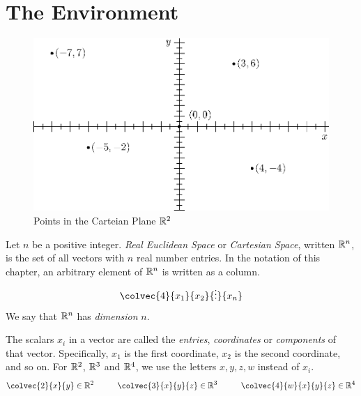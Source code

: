 \documentclass[fleqn,letterpaper]{report}
\begin{document}
\section{The Environment}
\label{vector-environment}

\begin{figure}[t]
\centering
\includegraphics[scale=1]{figure01.eps}
\caption{Points in the Carteian Plane $\mathbb{R}^2$}
\label{figure-cartesian-plane}
\end{figure}

\begin{defn}
Let $n$ be a positive integer. \emph{Real Euclidean Space} or
\emph{Cartesian Space}, written $\mathbb{R}^n$, is the set of all
vectors with $n$ real number entries. In the notation of this
chapter, an arbitrary element of $\mathbb{R}^n$ is written as a column. 
\begin{displaymath}
\colvec{4}{x_1}{x_2}{\vdots}{x_n}
\end{displaymath}
We say that $\mathbb{R}^n$ has \emph{dimension} $n$. 
\end{defn}

\begin{defn}
The scalars $x_i$ in a vector are
called the \emph{entries}, \emph{coordinates} or \emph{components} of that
vector. Specifically, $x_1$ is the first coordinate, $x_2$ is
the second coordinate, and so on. 
For $\mathbb{R}^2$, $\mathbb{R}^3$ and $\mathbb{R}^4$, we use the letters $x,y,z,w$
instead of $x_i$.
\begin{displaymath}
\colvec{2}{x}{y} \in \RR^2 \hspace{1cm}
\colvec{3}{x}{y}{z} \in \RR^3 \hspace{1cm}
\colvec{4}{w}{x}{y}{z} \in \RR^4
\end{displaymath}
\end{defn}
\end{document}
